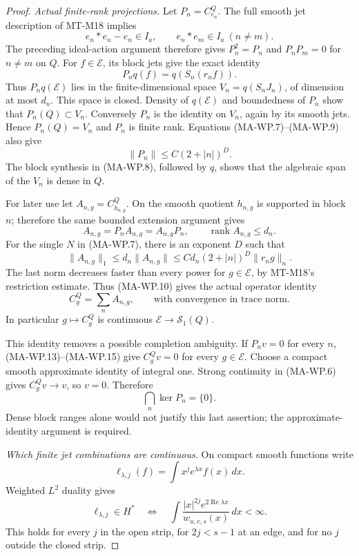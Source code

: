 \begin{proof}
\emph{Actual finite-rank projections.}
Let $P_n=C_{e_n}^{Q}$. The full smooth jet description of
MT-M18 implies
\[
 e_n*e_n-e_n\in I_a,\qquad
 e_n*e_m\in I_a\ (n\ne m).
\]
The preceding ideal-action argument therefore gives
$P_n^2=P_n$ and $P_nP_m=0$ for $n\ne m$ on $Q$.
For $f\in\mathcal E$, its block jets give the exact identity
\[
                 P_nq(f)=q(S_n(r_nf)).
 \tag{MA-WP.11}
\]
Thus $P_nq(\mathcal E)$ lies in the finite-dimensional space
$V_n=q(S_nJ_n)$, of dimension at most $d_n$. This space is
closed. Density of $q(\mathcal E)$ and boundedness of $P_n$
show that $P_n(Q)\subset V_n$. Conversely $P_n$ is the
identity on $V_n$, again by its smooth jets. Hence
$P_n(Q)=V_n$ and $P_n$ is finite rank. Equations
(MA-WP.7)--(MA-WP.9) also give
\[
                    \|P_n\|\le C(2+|n|)^D.
 \tag{MA-WP.12}
\]
The block synthesis in (MA-WP.8), followed by $q$, shows
that the algebraic span of the $V_n$ is dense in $Q$.

For later use let $A_{n,g}=C_{h_{n,g}}^Q$.
On the smooth quotient $h_{n,g}$ is supported in block $n$;
therefore the same bounded extension argument gives
\[
 A_{n,g}=P_nA_{n,g}=A_{n,g}P_n,
 \qquad \operatorname{rank} A_{n,g}\le d_n.
 \tag{MA-WP.13}
\]
For the single $N$ in (MA-WP.7), there is an exponent $D$
such that
\[
 \|A_{n,g}\|_1
 \le d_n\|A_{n,g}\|
 \le C d_n(2+|n|)^D\|r_ng\|_n.
 \tag{MA-WP.14}
\]
The last norm decreases faster than every power for
$g\in\mathcal E$, by MT-M18's restriction estimate.
Thus (MA-WP.10) gives the actual operator identity
\[
                  C_g^Q=\sum_n A_{n,g},
 \qquad\text{with convergence in trace norm.}
 \tag{MA-WP.15}
\]
In particular $g\mapsto C_g^Q$ is continuous
$\mathcal E\to\mathcal S_1(Q)$.

This identity removes a possible completion ambiguity.
If $P_n v=0$ for every $n$, (MA-WP.13)--(MA-WP.15)
give $C_g^Qv=0$ for every $g\in\mathcal E$.
Choose a compact smooth approximate identity of integral
one. Strong continuity in (MA-WP.6) gives $C_g^Qv\to v$,
so $v=0$. Therefore
\[
                         \bigcap_n\ker P_n=\{0\}.
 \tag{MA-WP.16}
\]
Dense block ranges alone would not justify this last assertion;
the approximate-identity argument is required.

\emph{Which finite jet combinations are continuous.}
On compact smooth functions write
\[
        \ell_{\lambda,j}(f)
             =\int x^j e^{\lambda x}f(x)\,dx.
\]
Weighted $L^2$ duality gives
\[
 \ell_{\lambda,j}\in H^*
 \quad\Longleftrightarrow\quad
 \int\frac{|x|^{2j}e^{2\operatorname{Re}\lambda x}}
                    {w_{u,v,s}(x)}\,dx<\infty.
 \tag{MA-WP.17}
\]
This holds for every $j$ in the open strip, for
$2j<s-1$ at an edge, and for no $j$ outside the closed
strip.


\end{proof}
